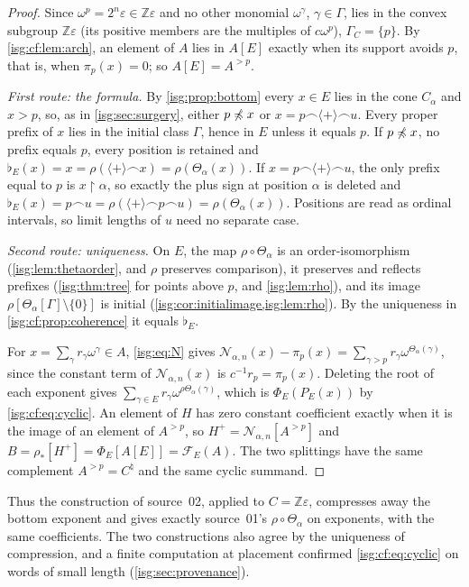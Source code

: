 \documentclass[11pt]{article}
\theoremstyle{definition}
\theoremstyle{remark}
\newcommand{\Z}{\mathbb{Z}}
\newcommand{\cat}{\mathbin{\frown}}
\newcommand{\plus}{\langle+\rangle}
\newcommand{\pre}{\mathrel{\preccurlyeq}}
\newcommand{\Rect}{\mathcal{N}_{\alpha,n}}
\newcommand{\tht}{\Theta_{\alpha}}
\newcommand{\cmp}[1]{\flat_{#1}}
\begin{document}
\begin{proof}
Since $\omega^p=2^n\varepsilon\in\Z\varepsilon$ and no other monomial
$\omega^\gamma$, $\gamma\in\Gamma$, lies in the convex subgroup
$\Z\varepsilon$ (its positive members are the multiples of
$c\omega^p$), $\Gamma_C=\{p\}$. By \cref{isg:cf:lem:arch}, an element of
$A$ lies in $A[E]$ exactly when its support avoids $p$, that is, when
$\pi_p(x)=0$; so $A[E]=A^{>p}$.

\emph{First route: the formula.} By \cref{isg:prop:bottom} every
$x\in E$ lies in the cone $C_\alpha$ and $x>p$, so, as in
\cref{isg:sec:surgery}, either $p\not\pre x$ or $x=p\cat\plus\cat u$.
Every proper prefix of $x$ lies in the initial class $\Gamma$, hence in
$E$ unless it equals $p$. If $p\not\pre x$, no prefix equals $p$, every
position is retained and $\cmp E(x)=x=\rho(\plus\cat x)=\rho(\tht(x))$.
If $x=p\cat\plus\cat u$, the only prefix equal to $p$ is
$x\restriction\alpha$, so exactly the plus sign at position $\alpha$ is
deleted and $\cmp E(x)=p\cat u=\rho(\plus\cat p\cat u)=\rho(\tht(x))$.
Positions are read as ordinal intervals, so limit lengths of $u$ need no
separate case.

\emph{Second route: uniqueness.} On $E$, the map $\rho\circ\tht$ is an
order-isomorphism (\cref{isg:lem:thetaorder}, and $\rho$ preserves
comparison), it preserves and reflects prefixes (\cref{isg:thm:tree} for
points above $p$, and \cref{isg:lem:rho}), and its image
$\rho[\tht[\Gamma]\setminus\{0\}]$ is initial
(\cref{isg:cor:initialimage,isg:lem:rho}). By the uniqueness in
\cref{isg:cf:prop:coherence} it equals $\cmp E$.

For $x=\sum_\gamma r_\gamma\omega^\gamma\in A$, \eqref{isg:eq:N} gives
$\Rect(x)-\pi_p(x)=\sum_{\gamma>p}r_\gamma\omega^{\tht(\gamma)}$, since the
constant term of $\Rect(x)$ is $c^{-1}r_p=\pi_p(x)$. Deleting the root of
each exponent gives $\sum_{\gamma\in E}r_\gamma\omega^{\rho\tht(\gamma)}$,
which is $\Phi_E(P_E(x))$ by \eqref{isg:cf:eq:cyclic}. An element of $H$
has zero constant coefficient exactly when it is the image of an element
of $A^{>p}$, so $H^+=\Rect[A^{>p}]$ and
$B=\rho_*[H^+]=\Phi_E[A[E]]=\mathcal F_E(A)$. The two splittings have the
same complement $A^{>p}=C^\natural$ and the same cyclic summand.
\end{proof}

Thus the construction of source~02, applied to $C=\Z\varepsilon$,
compresses away the bottom exponent and gives exactly source~01's
$\rho\circ\tht$ on exponents, with the same coefficients. The two
constructions also agree by the uniqueness of compression, and a finite
computation at placement confirmed \eqref{isg:cf:eq:cyclic} on words of
small length (\cref{isg:sec:provenance}).
\end{document}
